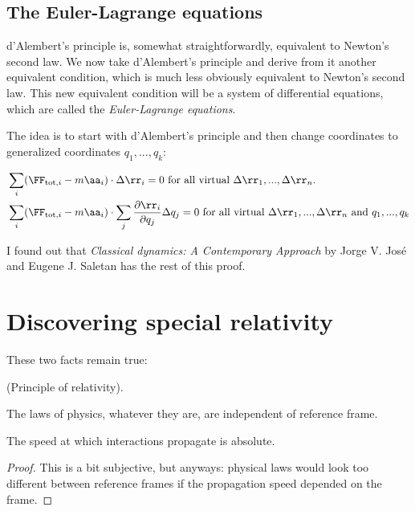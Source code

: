 \documentclass{article}
\begin{document}
\subsection*{The Euler-Lagrange equations}

d'Alembert's principle is, somewhat straightforwardly, equivalent to Newton's second law. We now take d'Alembert's principle and derive from it another equivalent condition, which is much less obviously equivalent to Newton's second law. This new equivalent condition will be a system of differential equations, which are called the \textit{Euler-Lagrange equations}.

The idea is to start with d'Alembert's principle and then change coordinates to generalized coordinates $q_1, ..., q_k$:

\begin{align*}
    &\sum_i (\FF_{\text{tot},i} - m\aa_i) \cdot \Delta \rr_i = 0 \text{ for all virtual $\Delta \rr_1, ..., \Delta \rr_n$}. \\
    &\sum_i (\FF_{\text{tot},i} - m\aa_i) \cdot \sum_j \frac{\pd \rr_i}{\pd q_j} \Delta q_j = 0 \text{ for all virtual $\Delta \rr_1, ..., \Delta \rr_n$ and $q_1, ..., q_k$}
\end{align*}

I found out that \textit{Classical dynamics: A Contemporary Approach} by Jorge V. Jos\'e and Eugene J. Saletan has the rest of this proof.

\newpage

\section*{Discovering special relativity}

These two facts remain true:

\begin{axiom}
	(Principle of relativity).
	
	The laws of physics, whatever they are, are independent of reference frame.
\end{axiom}

\begin{theorem}
	The speed at which interactions propagate is absolute.
\end{theorem}

\begin{proof}
	This is a bit subjective, but anyways: physical laws would look too different between reference frames if the propagation speed depended on the frame.
\end{proof}
\end{document}
